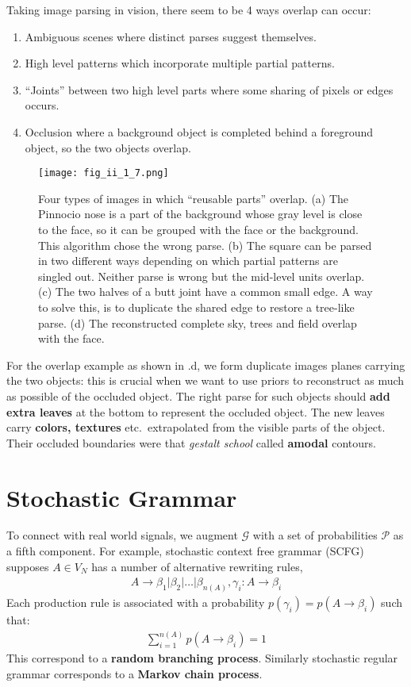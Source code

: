 \documentclass[../Notes_of_CaRiVaC.tex]{subfiles}
\begin{document}
Taking image parsing in vision, there seem to be 4 ways overlap can occur:
%
\begin{enumerate}
  \item Ambiguous scenes where distinct parses suggest themselves.
  \item High level patterns which incorporate multiple partial patterns.
  \item ``Joints'' between two high level parts where some sharing of pixels or
    edges occurs.
  \item Occlusion where a background object is completed behind a foreground
    object, so the two objects overlap.
\end{enumerate}
%
\pagebreak
%
\begin{figure}[!htpb]
  \centering
  \texttt{[image: fig\_ii\_1\_7.png]}
  \caption{Four types of images in which ``reusable parts'' overlap. (a) The
    Pinnocio nose is a part of the background whose gray level is close to the
    face, so it can be grouped with the face or the background. This algorithm
    chose the wrong parse. (b) The square can be parsed in two different ways
    depending on which partial patterns are singled out. Neither parse is wrong
    but the mid-level units overlap. (c) The two halves of a butt joint have a
    common small edge. A way to solve this, is to duplicate the shared edge to
    restore a tree-like parse. (d) The reconstructed complete sky, trees and
    field overlap with the face.}%
  \label{fig:ii.1.7}
\end{figure}
%
For the overlap example as shown in .d, we form duplicate images
planes carrying the two objects: this is crucial when we want to use priors to
reconstruct as much as possible of the occluded object. The right parse for
such objects should \textbf{add extra leaves} at the bottom to represent the
occluded object. The new  leaves carry \textbf{colors, textures} etc.\,
extrapolated from the visible parts of the object. Their occluded boundaries
were that \textit{gestalt school} called \textbf{amodal} contours.

\section{Stochastic Grammar}%
\label{sec:ii.1.4}
To connect with real world signals, we augment $\mathcal{G}$ with a set of
probabilities $\mathcal{P}$ as a fifth component. For example, stochastic
context free grammar (SCFG) supposes $A \in V_N$ has a number of alternative
rewriting rules,
%
\begin{align}
  \label{eq:ii.1.7}
  \tag{1.7}
  A \to \beta_1 \vert \beta_2 \vert \ldots \vert \beta_{n(A)}, \gamma_i: A \to \beta_i
\end{align}
%
Each production rule is associated with a probability
$p(\gamma_i) = p(A \to \beta_i)$ such that:
%
\begin{align}
  \label{eq:ii.1.8}
  \tag{1.8}
  \sum^{n(A)}_{i=1} p(A \to \beta_i) = 1
\end{align}
%
This correspond to a \textbf{random branching process}. Similarly stochastic
regular grammar corresponds to a \textbf{Markov chain process}.
\end{document}
